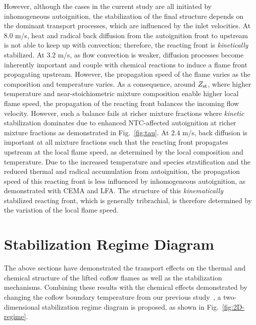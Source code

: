 \documentclass[review,3p,times]{elsarticle}
\begin{document}
However, although the cases in the current study are all initiated by inhomogeneous autoignition, the stabilization of the final structure depends on the dominant transport processes, which are influenced by the inlet velocities.  At $8.0$ m/s, heat and radical back diffusion from the autoignition front to upstream is not able to keep up with convection; therefore, the reacting front is \emph{kinetically} stabilized.  At $3.2$ m/s, \textcolor{cm}{as flow convection is weaker, diffusion processes become inherently important and couple with chemical reactions to induce a flame front propagating upstream.}  However, the propagation speed of the flame varies as the composition and temperature varies.  As a consequence, around $Z_{\rm st}$, where higher temperature and near-stoichiometric mixture composition enable higher local flame speed, the propagation of the reacting front balances the incoming flow velocity.  However, such a balance fails at richer mixture fractions where \emph{kinetic} stabilization dominates due to enhanced NTC-affected autoignition at richer mixture fractions as demonstrated in Fig.~\ref{fig:tau}.  At $2.4$ m/s, back diffusion is important at all mixture fractions such that the reacting front propagates upstream at the local flame speed, as determined by the local composition and temperature.  Due to the increased temperature and species stratification and the reduced thermal and radical accumulation from autoignition, the propagation speed of this reacting front is less influenced by inhomogeneous autoignition, as demonstrated with CEMA and LFA.  The structure of this \emph{kinematically} stabilized reacting front, which is generally tribrachial, is therefore determined by the variation of the local flame speed. 


       
\section{Stabilization Regime Diagram}

The above sections have demonstrated the transport effects on the thermal and chemical structure of the lifted coflow flames as well as the stabilization mechanisms.  Combining these results with the chemical effects demonstrated by changing the coflow boundary temperature from our previous study~\cite{deng15}, a two-dimensional stabilization regime diagram is proposed, as shown in Fig.~\ref{fig:2D-regime}.   
\end{document}
